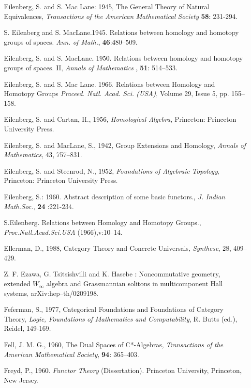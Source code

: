 \documentclass[12pt]{article}
\theoremstyle{plain}
\theoremstyle{definition}
\numberwithin{equation}{section}
\begin{document}
\begin{thebibliography}{9}
Eilenberg, S. and S. Mac Lane: 1945, The General Theory of Natural Equivalences, \emph{Transactions of the American Mathematical Society} \textbf{58}: 231-294.


S. Eilenberg and S. MacLane.1945. Relations between homology 
and homotopy groups of spaces. {\em Ann. of Math.}, \textbf{46}:480--509.


Eilenberg, S. and S. MacLane. 1950. Relations between homology and homotopy groups of spaces. II,  
{\em Annals of Mathematics} , \textbf{51}: 514--533.

Eilenberg, S. and S. Mac Lane. 1966. Relations between Homology and Homotopy Groups
{\em Proceed. Natl. Acad. Sci. (USA)}, Volume 29, Issue 5, pp. 155--158.

Eilenberg, S. and Cartan, H., 1956, \emph{Homological Algebra}, Princeton: Princeton University Press. 

Eilenberg, S. and MacLane, S., 1942, Group Extensions and Homology, \emph{Annals of Mathematics}, 43, 757--831. 

Eilenberg, S. and Steenrod, N., 1952, \emph{Foundations of Algebraic Topology}, Princeton: Princeton University Press. 

Eilenberg, S.: 1960. Abstract description of some basic functors., \emph{J. Indian Math.Soc.}, \textbf{24} :221-234.

S.Eilenberg. Relations between Homology and Homotopy Groups., \emph{Proc.Natl.Acad.Sci.USA} (1966),v:10--14.  

Ellerman, D., 1988, Category Theory and Concrete Universals, {\em Synthese}, 28, 409--429. 

Z. F. Ezawa, G. Tsitsishvilli and K. Hasebe : Noncommutative geometry, extended $W_{\infty}$ algebra and Grassmannian solitons in multicomponent Hall systems, arXiv:hep--th/0209198.

Feferman, S., 1977, Categorical Foundations and Foundations of Category Theory, 
{\em Logic, Foundations of Mathematics and Computability}, R. Butts (ed.), Reidel, 149-169.

Fell, J. M. G., 1960, The Dual Spaces of  C*-Algebras, {\em Transactions of the 
American Mathematical Society}, \textbf{94}: 365--403. 

Freyd, P., 1960. \emph{Functor Theory} (Dissertation). Princeton University, Princeton, New Jersey.
 

\end{thebibliography}
\end{document}

